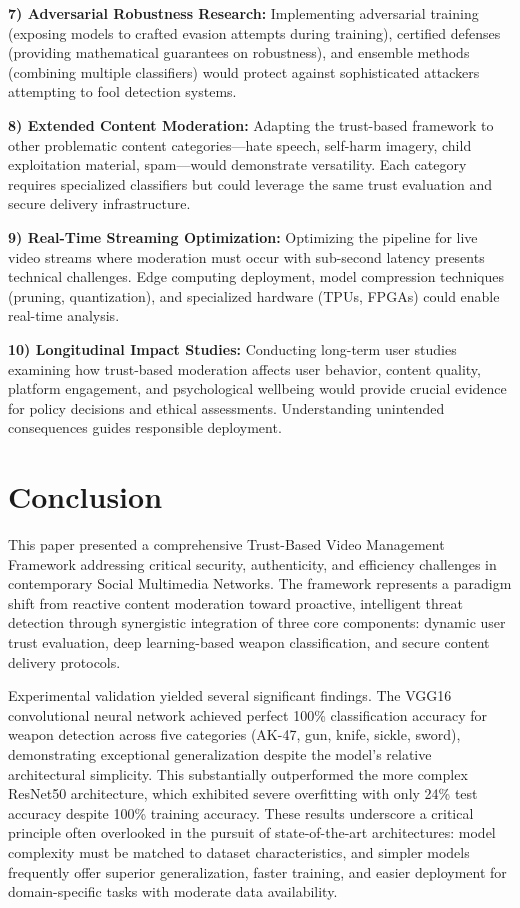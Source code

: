 \documentclass[conference]{IEEEtran}
\begin{document}
\textbf{7) Adversarial Robustness Research:} Implementing adversarial training (exposing models to crafted evasion attempts during training), certified defenses (providing mathematical guarantees on robustness), and ensemble methods (combining multiple classifiers) would protect against sophisticated attackers attempting to fool detection systems.

\textbf{8) Extended Content Moderation:} Adapting the trust-based framework to other problematic content categories—hate speech, self-harm imagery, child exploitation material, spam—would demonstrate versatility. Each category requires specialized classifiers but could leverage the same trust evaluation and secure delivery infrastructure.

\textbf{9) Real-Time Streaming Optimization:} Optimizing the pipeline for live video streams where moderation must occur with sub-second latency presents technical challenges. Edge computing deployment, model compression techniques (pruning, quantization), and specialized hardware (TPUs, FPGAs) could enable real-time analysis.

\textbf{10) Longitudinal Impact Studies:} Conducting long-term user studies examining how trust-based moderation affects user behavior, content quality, platform engagement, and psychological wellbeing would provide crucial evidence for policy decisions and ethical assessments. Understanding unintended consequences guides responsible deployment.

\section{Conclusion}

This paper presented a comprehensive Trust-Based Video Management Framework addressing critical security, authenticity, and efficiency challenges in contemporary Social Multimedia Networks. The framework represents a paradigm shift from reactive content moderation toward proactive, intelligent threat detection through synergistic integration of three core components: dynamic user trust evaluation, deep learning-based weapon classification, and secure content delivery protocols.

Experimental validation yielded several significant findings. The VGG16 convolutional neural network achieved perfect 100\% classification accuracy for weapon detection across five categories (AK-47, gun, knife, sickle, sword), demonstrating exceptional generalization despite the model's relative architectural simplicity. This substantially outperformed the more complex ResNet50 architecture, which exhibited severe overfitting with only 24\% test accuracy despite 100\% training accuracy. These results underscore a critical principle often overlooked in the pursuit of state-of-the-art architectures: model complexity must be matched to dataset characteristics, and simpler models frequently offer superior generalization, faster training, and easier deployment for domain-specific tasks with moderate data availability.
\end{document}
